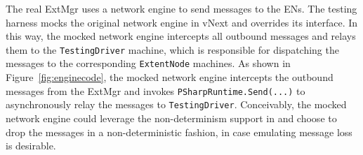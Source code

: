 
%

The real ExtMgr uses a network engine to send messages to the ENs. The testing harness mocks the original network engine in vNext and overrides its interface. In this way, the mocked network engine intercepts all outbound messages and relays them to the \texttt{TestingDriver} machine, which is responsible for dispatching the messages to the corresponding \texttt{ExtentNode} machines. As shown in Figure~\ref{fig:enginecode}, the mocked network engine intercepts the outbound messages from the ExtMgr and invokes \texttt{PSharpRuntime.Send(...)} to asynchronously relay the messages to \texttt{TestingDriver}. Conceivably, the mocked network engine could leverage the non-determinism support in \psharp and choose to drop the messages in a non-deterministic fashion, in case emulating message loss is desirable. 

